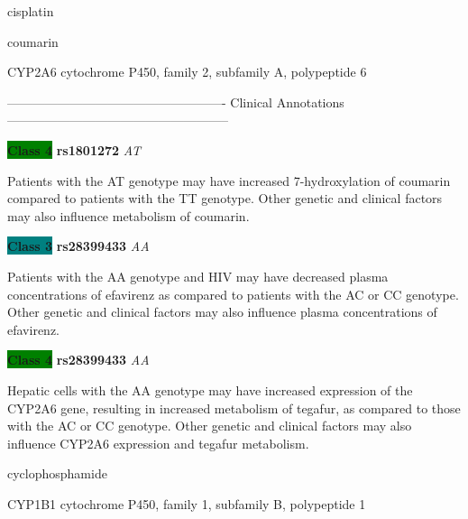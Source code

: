 \documentclass{resume} %
\begin{document}
\begin{rSection}{ cisplatin }
\end{rSection}\begin{rSection}{ coumarin }
\item[]

\begin{rSubsection}{ CYP2A6 }{ cytochrome P450, family 2, subfamily A, polypeptide 6 }{}{}
\item[]

\item[] ---------------------------------------------------- Clinical Annotations -----------------------------------------------------\newline
\item \textbf{\colorbox{green} {Class 4}} \textbf{ rs1801272 } \textit{ AT }
\item[] Patients with the AT genotype may have increased 7-hydroxylation of coumarin compared to patients with the TT genotype. Other genetic and clinical factors may also influence metabolism of coumarin.\item \textbf{\colorbox{teal} {Class 3}} \textbf{ rs28399433 } \textit{ AA }
\item[] Patients with the AA genotype and HIV may have decreased plasma concentrations of efavirenz as compared to patients with the AC or CC genotype. Other genetic and clinical factors may also influence plasma concentrations of efavirenz.\item \textbf{\colorbox{green} {Class 4}} \textbf{ rs28399433 } \textit{ AA }
\item[] Hepatic cells with the AA genotype may have increased expression of the CYP2A6 gene, resulting in increased metabolism of tegafur, as compared to those with the AC or CC genotype. Other genetic and clinical factors may also influence CYP2A6 expression and tegafur metabolism.
\end{rSubsection}

\end{rSection}\begin{rSection}{ cyclophosphamide }
\item[]

\begin{rSubsection}{ CYP1B1 }{ cytochrome P450, family 1, subfamily B, polypeptide 1 }{}{}
\item[]


\end{rSubsection}
\end{rSection}
\end{document}
